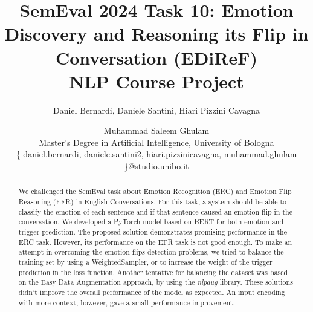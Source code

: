 \documentclass[11pt,table,xcdraw]{article}
\begin{document}
%
\title{SemEval 2024 Task 10: Emotion Discovery and Reasoning its Flip in Conversation (EDiReF)\\
\large {}
NLP Course Project
}
\author{
    Daniel Bernardi,
    Daniele Santini,
    Hiari Pizzini Cavagna
    \and
    Muhammad Saleem Ghulam\\
Master's Degree in Artificial Intelligence, University of Bologna\\
\{ daniel.bernardi, daniele.santini2, hiari.pizzinicavagna, muhammad.ghulam \}@studio.unibo.it
}
\maketitle



\begin{abstract}
We challenged the SemEval task about Emotion Recognition (ERC) and Emotion Flip Reasoning (EFR) in English Conversations. For this task, a system should be able to classify the emotion of each sentence and if that sentence caused an emotion flip in the conversation.
We developed a PyTorch model based on BERT for both emotion and trigger prediction. 
The proposed solution demonstrates promising performance in the ERC task. However, its performance on the EFR task is not good enough. 
To make an attempt in overcoming the emotion flips detection problems, we tried to balance the training set by using a WeightedSampler, or to increase the weight of the trigger prediction in the loss function. Another tentative for balancing the dataset was based on the Easy Data Augmentation approach, by using the \textit{nlpaug} library. These solutions didn't improve the overall performance of the model as expected. An input encoding with more context, however, gave a small performance improvement.




\end{abstract}
\end{document}
